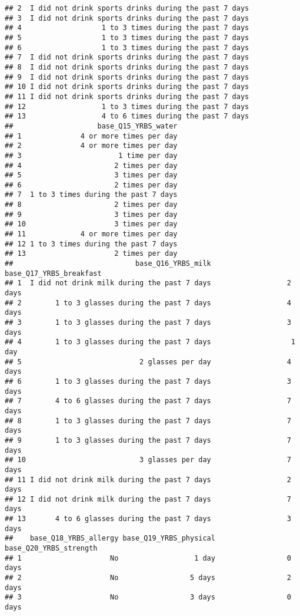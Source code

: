 \documentclass[]{article}
\begin{document}
\begin{verbatim}
## 2  I did not drink sports drinks during the past 7 days
## 3  I did not drink sports drinks during the past 7 days
## 4                   1 to 3 times during the past 7 days
## 5                   1 to 3 times during the past 7 days
## 6                   1 to 3 times during the past 7 days
## 7  I did not drink sports drinks during the past 7 days
## 8  I did not drink sports drinks during the past 7 days
## 9  I did not drink sports drinks during the past 7 days
## 10 I did not drink sports drinks during the past 7 days
## 11 I did not drink sports drinks during the past 7 days
## 12                  1 to 3 times during the past 7 days
## 13                  4 to 6 times during the past 7 days
##                    base_Q15_YRBS_water
## 1              4 or more times per day
## 2              4 or more times per day
## 3                       1 time per day
## 4                      2 times per day
## 5                      3 times per day
## 6                      2 times per day
## 7  1 to 3 times during the past 7 days
## 8                      2 times per day
## 9                      3 times per day
## 10                     3 times per day
## 11             4 or more times per day
## 12 1 to 3 times during the past 7 days
## 13                     2 times per day
##                             base_Q16_YRBS_milk base_Q17_YRBS_breakfast
## 1  I did not drink milk during the past 7 days                  2 days
## 2        1 to 3 glasses during the past 7 days                  4 days
## 3        1 to 3 glasses during the past 7 days                  3 days
## 4        1 to 3 glasses during the past 7 days                   1 day
## 5                            2 glasses per day                  4 days
## 6        1 to 3 glasses during the past 7 days                  3 days
## 7        4 to 6 glasses during the past 7 days                  7 days
## 8        1 to 3 glasses during the past 7 days                  7 days
## 9        1 to 3 glasses during the past 7 days                  7 days
## 10                           3 glasses per day                  7 days
## 11 I did not drink milk during the past 7 days                  2 days
## 12 I did not drink milk during the past 7 days                  7 days
## 13       4 to 6 glasses during the past 7 days                  3 days
##    base_Q18_YRBS_allergy base_Q19_YRBS_physical base_Q20_YRBS_strength
## 1                     No                  1 day                 0 days
## 2                     No                 5 days                 2 days
## 3                     No                 3 days                 0 days

\end{verbatim}
\end{document}
